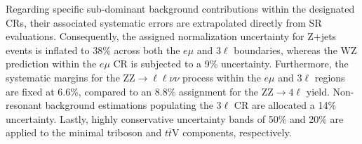 
Regarding specific sub-dominant background contributions within the designated CRs, their associated systematic errors are extrapolated directly from SR evaluations. Consequently, the assigned normalization uncertainty for $\text{Z}$+jets events is inflated to 38\% across both the $e\mu$ and $3\ell$ boundaries, whereas the $\text{WZ}$ prediction within the $e\mu$ CR is subjected to a 9\% uncertainty. Furthermore, the systematic margins for the $\text{ZZ} \to \ell\ell\nu\nu$ process within the $e\mu$ and $3\ell$ regions are fixed at 6.6\%, compared to an 8.8\% assignment for the $\text{ZZ} \to 4\ell$ yield. Non-resonant background estimations populating the $3\ell$ CR are allocated a 14\% uncertainty. Lastly, highly conservative uncertainty bands of 50\% and 20\% are applied to the minimal triboson and $t\bar{t}\text{V}$ components, respectively.